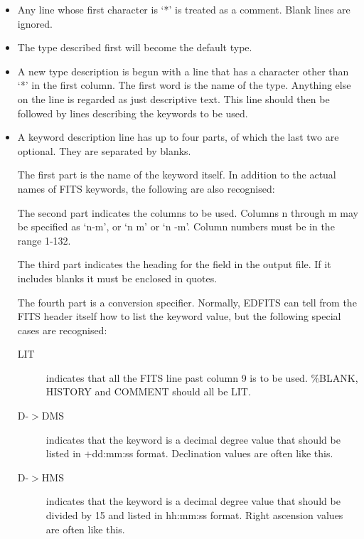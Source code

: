 \begin{itemize}

\item Any line whose first character is `*' is treated as a comment.
Blank lines are ignored.

\item The type described first will become the default type.

\item A new type description is begun with a line that has a character
other than `*' in the first column.  The first word is the name
of the type.  Anything else on the line is regarded as just
descriptive text.  This line should then be followed by lines
describing the keywords to be used.

\item A keyword description line has up to four parts, of which the
last two are optional.  They are separated by blanks.

The first part is the name of the keyword itself.  In addition
to the actual names of FITS keywords, the following are also
recognised:
The second part indicates the columns to be used.  Columns n
through m may be specified as `n-m', or `n m' or `n -m'.
Column numbers must be in the range 1-132.

The third part indicates the heading for the field in the output
file.  If it includes blanks it must be enclosed in quotes.

The fourth part is a conversion specifier.  Normally, EDFITS can
tell from the FITS header itself how to list the keyword value, but
the following special cases are recognised:
\begin{description}
\item[LIT] indicates that all the FITS line past column 9 is to be
used.  \%BLANK, HISTORY and COMMENT should all be LIT.
\item[D-$>$DMS]  indicates that the keyword is a decimal degree value that
should be listed in +dd:mm:ss format.  Declination values
are often like this.
\item[D-$>$HMS] indicates that the keyword is a decimal degree value that
should be divided by 15 and listed in hh:mm:ss format.
Right ascension values are often like this.
\end{description}


\end{itemize}
